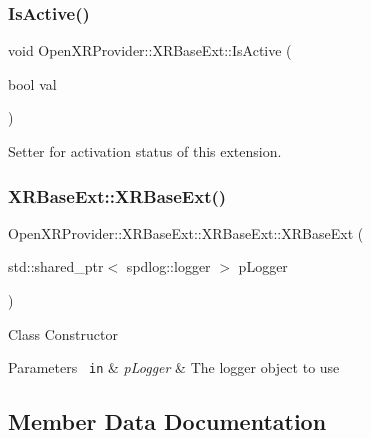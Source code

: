 \subsubsection{\texorpdfstring{IsActive()}{IsActive()}\hspace{0.1cm}{\footnotesize\ttfamily [2/2]}}
{\footnotesize\ttfamily void Open\+X\+R\+Provider\+::\+X\+R\+Base\+Ext\+::\+Is\+Active (\begin{DoxyParamCaption}\item[{bool}]{val }\end{DoxyParamCaption})\hspace{0.3cm}{\ttfamily [inline]}}



Setter for activation status of this extension. 

\mbox{\label{class_open_x_r_provider_1_1_x_r_base_ext_a8f59e68df5f1773152a3dfbe9ddc17fc}} 
\subsubsection{\texorpdfstring{XRBaseExt::XRBaseExt()}{XRBaseExt::XRBaseExt()}}
{\footnotesize\ttfamily Open\+X\+R\+Provider\+::\+X\+R\+Base\+Ext\+::\+X\+R\+Base\+Ext\+::\+X\+R\+Base\+Ext (\begin{DoxyParamCaption}\item[{std\+::shared\+\_\+ptr$<$ spdlog\+::logger $>$}]{p\+Logger }\end{DoxyParamCaption})\hspace{0.3cm}{\ttfamily [inline]}}

Class Constructor 
\begin{DoxyParams}[1]{Parameters}
\mbox{\texttt{ in}}  & {\em p\+Logger} & The logger object to use \\
\hline
\end{DoxyParams}


\subsection{Member Data Documentation}
\mbox{\label{class_open_x_r_provider_1_1_x_r_base_ext_a7be8f3a5c24c3396c29cf37c4848b1b2}} 

